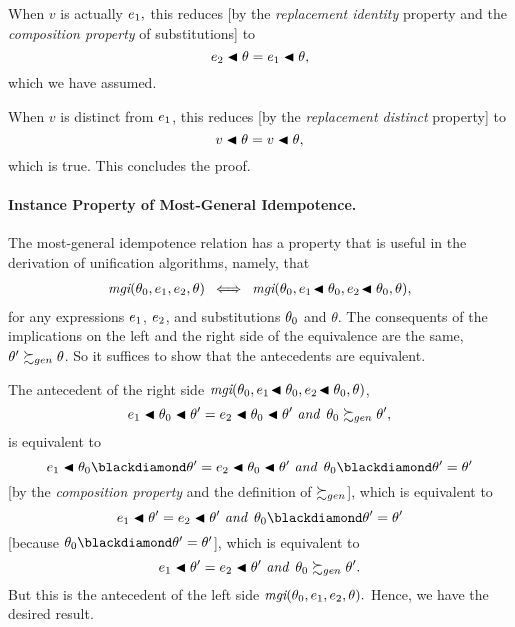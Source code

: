 \documentclass[runningheads]{llncs}
\DeclareMathOperator{\uand}{\emph{and}\,}
\DeclareMathOperator{\uiff}{\iff}
\DeclareMathOperator{\mgi}{\emph{mgi}}
\begin{document}
    When $v$ is actually $e_{1}, $ this reduces [by the \emph{replacement identity} property and the \emph{composition property} of substitutions] to
\[e_{2} \blacktriangleleft \theta = e_{1} \blacktriangleleft \theta,\]
which we have assumed.

When $v$ is distinct from $e_{1}$, this reduces [by the \emph{replacement distinct} property] to
\[v \blacktriangleleft \theta = v \blacktriangleleft \theta, \] which is true.  This concludes the proof.

\paragraph{Instance Property of Most-General Idempotence.} The most-general idempotence relation has a property that is useful in the derivation of unification algorithms, namely, that
\begin{align*}
 {\mgi}(\thet{0}, \e{1}, \e{2}, \theta) \,\, \uiff \,\, 
  {\mgi}(\thet{0}, \e{1}\!\apply\thet{0}, \e{2}\!\apply\thet{0}, \theta),
 \end{align*}
for any expressions $e_{1}$, $e_{2}$, and substitutions $\theta_{0}$ and $\theta$. The consequents of the implications on the left and the right side of the equivalence are the same, $\theta' \succsim_{gen} \theta$. So it suffices to show that the antecedents are equivalent.  

The antecedent of the right side ${\mgi}(\thet{0}, \e{1}\!\apply\thet{0}, \e{2}\!\apply\thet{0}, \theta)$,
\[\e{1}  \apply \thet{0} \apply \theta' = \e{2} \apply\thet{0} \apply \theta' \, \uand \,   
  \thet{0} \moregen \theta', \]
  is equivalent to
 \[\e{1}  \apply \thet{0} \compose \theta' = \e{2}  \apply \thet{0} \apply \theta' \, \uand \,   
  \thet{0} \compose \theta' = \theta' \]
[by the \emph{composition property} and the definition of $\succsim_{gen}$],  which is equivalent to 
\[\e{1} \apply \theta' = \e{2} \apply \theta' \, \uand \,   
  \thet{0} \compose \theta' = \theta'\]
[because $\thet{0} \compose \theta' = \theta'$],  which is equivalent to
\[\e{1} \apply \theta' = \e{2} \apply \theta' \, \uand \,   
  \thet{0} \moregen \theta'. \]
  But this is the antecedent of the left side ${\mgi}(\thet{0}, \e{1}, \e{2}, \theta).$
Hence, we have the desired result.
\end{document}
